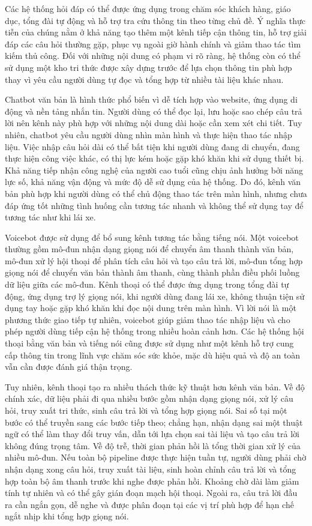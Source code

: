 \documentclass[a4paper,13pt,oneside]{report}
\begin{document}
Các hệ thống hỏi đáp có thể được ứng dụng trong chăm sóc khách hàng, giáo dục, tổng đài tự động và hỗ trợ tra cứu thông tin theo từng chủ đề. Ý nghĩa thực tiễn của chúng nằm ở khả năng tạo thêm một kênh tiếp cận thông tin, hỗ trợ giải đáp các câu hỏi thường gặp, phục vụ ngoài giờ hành chính và giảm thao tác tìm kiếm thủ công. Đối với những nội dung có phạm vi rõ ràng, hệ thống còn có thể sử dụng một kho tri thức được xây dựng trước để lựa chọn thông tin phù hợp thay vì yêu cầu người dùng tự đọc và tổng hợp từ nhiều tài liệu khác nhau.

Chatbot văn bản là hình thức phổ biến vì dễ tích hợp vào website, ứng dụng di động và nền tảng nhắn tin. Người dùng có thể đọc lại, lưu hoặc sao chép câu trả lời nên kênh này phù hợp với những nội dung dài hoặc cần xem xét chi tiết. Tuy nhiên, chatbot yêu cầu người dùng nhìn màn hình và thực hiện thao tác nhập liệu. Việc nhập câu hỏi dài có thể bất tiện khi người dùng đang di chuyển, đang thực hiện công việc khác, có thị lực kém hoặc gặp khó khăn khi sử dụng thiết bị. Khả năng tiếp nhận công nghệ của người cao tuổi cũng chịu ảnh hưởng bởi năng lực số, khả năng vận động và mức độ dễ sử dụng của hệ thống. Do đó, kênh văn bản phù hợp khi người dùng có thể chủ động thao tác trên màn hình, nhưng chưa đáp ứng tốt những tình huống cần tương tác nhanh và không thể sử dụng tay để tương tác như khi lái xe.

Voicebot được sử dụng để bổ sung kênh tương tác bằng tiếng nói. Một voicebot thường gồm mô-đun nhận dạng giọng nói để chuyển âm thanh thành văn bản, mô-đun xử lý hội thoại để phân tích câu hỏi và tạo câu trả lời, mô-đun tổng hợp giọng nói để chuyển văn bản thành âm thanh, cùng thành phần điều phối luồng dữ liệu giữa các mô-đun. Kênh thoại có thể được ứng dụng trong tổng đài tự động, ứng dụng trợ lý giọng nói, khi người dùng đang lái xe, không thuận tiện sử dụng tay hoặc gặp khó khăn khi đọc nội dung trên màn hình. Vì lời nói là một phương thức giao tiếp tự nhiên, voicebot giúp giảm thao tác nhập liệu và cho phép người dùng tiếp cận hệ thống trong nhiều hoàn cảnh hơn. Các hệ thống hội thoại bằng văn bản và tiếng nói cũng được sử dụng như một kênh hỗ trợ cung cấp thông tin trong lĩnh vực chăm sóc sức khỏe, mặc dù hiệu quả và độ an toàn vẫn cần được đánh giá thận trọng.

Tuy nhiên, kênh thoại tạo ra nhiều thách thức kỹ thuật hơn kênh văn bản. Về độ chính xác, dữ liệu phải đi qua nhiều bước gồm nhận dạng giọng nói, xử lý câu hỏi, truy xuất tri thức, sinh câu trả lời và tổng hợp giọng nói. Sai số tại một bước có thể truyền sang các bước tiếp theo; chẳng hạn, nhận dạng sai một thuật ngữ có thể làm thay đổi truy vấn, dẫn tới lựa chọn sai tài liệu và tạo câu trả lời không đúng trọng tâm. Về độ trễ, thời gian phản hồi là tổng thời gian xử lý của nhiều mô-đun. Nếu toàn bộ pipeline được thực hiện tuần tự, người dùng phải chờ nhận dạng xong câu hỏi, truy xuất tài liệu, sinh hoàn chỉnh câu trả lời và tổng hợp toàn bộ âm thanh trước khi nghe được phản hồi. Khoảng chờ dài làm giảm tính tự nhiên và có thể gây gián đoạn mạch hội thoại. Ngoài ra, câu trả lời đầu ra cần ngắn gọn, dễ nghe và được phân đoạn tại các vị trí phù hợp để hạn chế ngắt nhịp khi tổng hợp giọng nói.
\end{document}

